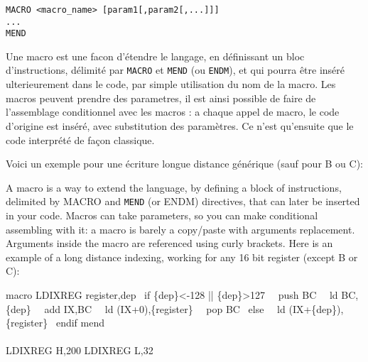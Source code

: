 \subsubsection{}\label{MACRO}
\begin{verbatim}
MACRO <macro_name> [param1[,param2[,...]]]
...
MEND
\end{verbatim}

\begin{xfr}
Une macro est une facon d'étendre le langage, en définissant un bloc d'instructions, délimité par \texttt{MACRO} et \texttt{MEND} (ou \texttt{ENDM}), et qui pourra être inséré ulterieurement dans le code, par simple utilisation du nom de la macro.
Les macros peuvent prendre des parametres, il est ainsi possible de faire de l'assemblage conditionnel avec les macros : a  chaque appel de macro, le code d'origine est inséré, avec substitution des paramètres. Ce n'est qu'ensuite que le code interprété de façon classique.

Voici un exemple pour une écriture longue distance générique (sauf pour B ou C):

\end{xfr}

\begin{xen}
A macro is a way to extend the language, by defining a block of instructions, delimited by MACRO and \texttt{MEND} (or ENDM) directives, that can later be inserted in your code.
Macros can take parameters, so you can make conditional assembling with it: a macro is barely a copy/paste with arguments replacement. Arguments inside the macro are referenced using curly brackets. Here is an example of a long distance indexing, working for any 16 bit register (except B or C):
\end{xen}

\begin{code}
macro LDIXREG register,dep
\ if \{dep\}\textless-128 || \{dep\}\textgreater127
\ \ push BC
\ \ ld BC,\{dep\}
\ \ add IX,BC
\ \ ld (IX+0),\{register\}
\ \ pop BC
\ else
\ \ ld (IX+\{dep\}),\{register\}
\ endif
mend
\end{code}

\paragraph{}

\begin{code}
LDIXREG H,200
LDIXREG L,32
\end{code}

